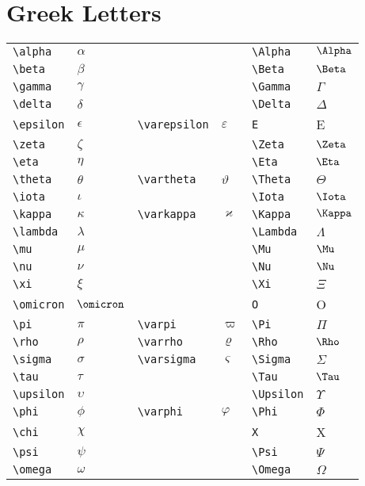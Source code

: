 \documentclass[text,xhtml,itex]{internet}
\begin{document}
\section{Greek Letters}

\begin{tabular}{llllll}
\verb+\alpha+ & \(\alpha\) &&& \verb+\Alpha+ & \(\Alpha\) \\
\verb+\beta+ & \(\beta\) &&& \verb+\Beta+ & \(\Beta\) \\
\verb+\gamma+ & \(\gamma\) &&& \verb+\Gamma+ & \(\Gamma\) \\
\verb+\delta+ & \(\delta\) &&& \verb+\Delta+ & \(\Delta\) \\
\verb+\epsilon+ & \(\epsilon\) & \verb+\varepsilon+ & \(\varepsilon\) & \verb+E+ & E \\
\verb+\zeta+ & \(\zeta\) &&& \verb+\Zeta+ & \(\Zeta\) \\
\verb+\eta+ & \(\eta\) &&& \verb+\Eta+ & \(\Eta\) \\
\verb+\theta+ & \(\theta\) & \verb+\vartheta+ & \(\vartheta\) & \verb+\Theta+ & \(\Theta\) \\
\verb+\iota+ & \(\iota\) &&& \verb+\Iota+ & \(\Iota\) \\
\verb+\kappa+ & \(\kappa\) & \verb+\varkappa+ & \(\varkappa\) & \verb+\Kappa+ & \(\Kappa\) \\
\verb+\lambda+ & \(\lambda\) &&& \verb+\Lambda+ & \(\Lambda\) \\
\verb+\mu+ & \(\mu\) &&& \verb+\Mu+ & \(\Mu\) \\
\verb+\nu+ & \(\nu\) &&& \verb+\Nu+ & \(\Nu\) \\
\verb+\xi+ & \(\xi\) &&& \verb+\Xi+ & \(\Xi\) \\
\verb+\omicron+ & \(\omicron\) &&& \verb+O+ & O \\
\verb+\pi+ & \(\pi\) & \verb+\varpi+ & \(\varpi\) & \verb+\Pi+ & \(\Pi\) \\
\verb+\rho+ & \(\rho\) & \verb+\varrho+ & \(\varrho\) & \verb+\Rho+ & \(\Rho\) \\
\verb+\sigma+ & \(\sigma\) & \verb+\varsigma+ & \(\varsigma\) & \verb+\Sigma+ & \(\Sigma\) \\
\verb+\tau+ & \(\tau\) &&& \verb+\Tau+ & \(\Tau\) \\
\verb+\upsilon+ & \(\upsilon\) &&& \verb+\Upsilon+ & \(\Upsilon\) \\
\verb+\phi+ & \(\phi\) & \verb+\varphi+ & \(\varphi\) & \verb+\Phi+ & \(\Phi\) \\
\verb+\chi+ & \(\chi\) &&& \verb+X+ & X \\
\verb+\psi+ & \(\psi\) &&& \verb+\Psi+ & \(\Psi\) \\
\verb+\omega+ & \(\omega\) &&& \verb+\Omega+ & \(\Omega\)
\end{tabular}
\end{document}
